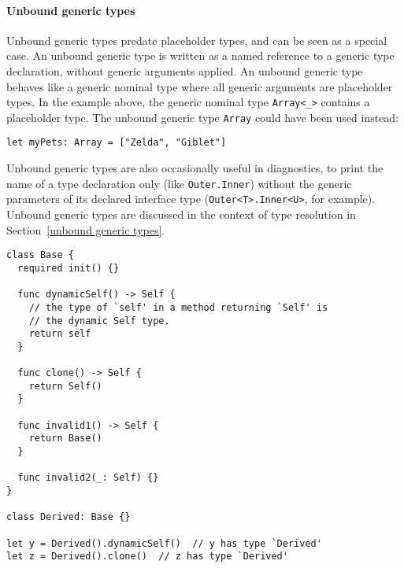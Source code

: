 \documentclass[../generics]{subfiles}
\begin{document}
\paragraph{Unbound generic types}
Unbound generic types predate placeholder types, and can be seen as a special case. An unbound generic type is written as a named reference to a generic type declaration, without generic arguments applied. An unbound generic type behaves like a generic nominal type where all generic arguments are placeholder types. In the example above, the generic nominal type \texttt{Array<\_>} contains a placeholder type. The unbound generic type \texttt{Array} could have been used instead:
\begin{Verbatim}
let myPets: Array = ["Zelda", "Giblet"]
\end{Verbatim}
Unbound generic types are also occasionally useful in diagnostics, to print the name of a type declaration only (like \texttt{Outer.Inner}) without the generic parameters of its declared interface type (\texttt{Outer<T>.Inner<U>}, for example). Unbound generic types are discussed in the context of type resolution in Section~\ref{unbound generic types}.

\begin{listing}\label{dynamic self example}
\begin{Verbatim}
class Base {
  required init() {}
  
  func dynamicSelf() -> Self {
    // the type of `self' in a method returning `Self' is
    // the dynamic Self type.
    return self
  }

  func clone() -> Self {
    return Self()
  }
  
  func invalid1() -> Self {
    return Base()
  }
  
  func invalid2(_: Self) {}
}

class Derived: Base {}

let y = Derived().dynamicSelf()  // y has type `Derived'
let z = Derived().clone()  // z has type `Derived'
\end{Verbatim}
\end{listing}
\end{document}
